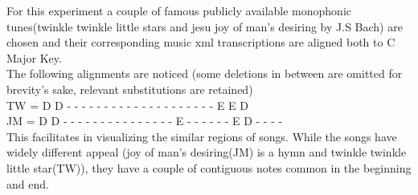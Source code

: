 \noindent For this experiment a couple of famous publicly available monophonic tunes(twinkle twinkle little stars and jesu joy of man's desiring by J.S Bach) are chosen and their corresponding music xml transcriptions are aligned both to C Major Key. \\

\noindent The following alignments are noticed (some deletions in between are omitted for brevity's sake, relevant substitutions are retained) \\

\noindent TW = D D - - - - - - - - - - - - - - - - - - - - E E D \\
\noindent JM = D D - - - - - - - - - - - - - - - E - - - - - - E D - - - - \\ 

\noindent This facilitates in visualizing the similar regions of songs. While the songs have widely different appeal (joy of man's desiring(JM) is a hymn and twinkle twinkle little star(TW)), they have a couple of contiguous notes common in the beginning and end.  


 


